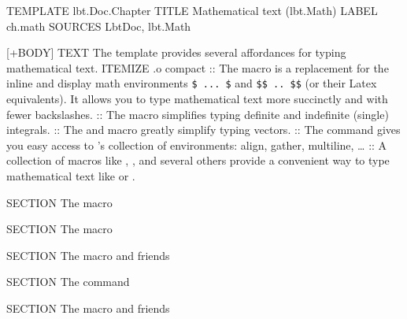 \begin{lbt}
  [@META]
    TEMPLATE lbt.Doc.Chapter
    TITLE Mathematical text \textsf{(lbt.Math)}
    LABEL ch.math
    SOURCES LbtDoc, lbt.Math

  [+BODY]
    TEXT The  template provides several affordances for typing mathematical text.
    ITEMIZE .o compact
    :: The  macro is a replacement for the inline and display math environments \Verb|$ ... $| and \Verb|$$ .. $$| (or their Latex equivalents). It allows you to type mathematical text more succinctly and with fewer backslashes.
    :: The  macro simplifies typing definite and indefinite (single) integrals.
    :: The  and  macro greatly simplify typing vectors.
    :: The  command gives you easy access to 's collection of environments: align, gather, multiline, \dots
    :: A collection of macros like , ,  and several others provide a convenient way to type mathematical text like  or .

    SECTION The  macro

    SECTION The  macro

    SECTION The  macro and friends

    SECTION The  command

    SECTION The  macro and friends

\end{lbt}
